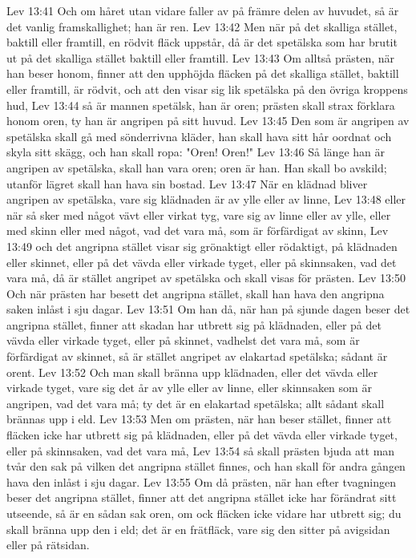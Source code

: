 Lev 13:41  Och om håret utan vidare faller av på främre delen av huvudet, så är det vanlig framskallighet; han är ren.
Lev 13:42  Men när på det skalliga stället, baktill eller framtill, en rödvit fläck uppstår, då är det spetälska som har brutit ut på det skalliga stället baktill eller framtill.
Lev 13:43  Om alltså prästen, när han beser honom, finner att den upphöjda fläcken på det skalliga stället, baktill eller framtill, är rödvit, och att den visar sig lik spetälska på den övriga kroppens hud,
Lev 13:44  så är mannen spetälsk, han är oren; prästen skall strax förklara honom oren, ty han är angripen på sitt huvud.
Lev 13:45  Den som är angripen av spetälska skall gå med sönderrivna kläder, han skall hava sitt hår oordnat och skyla sitt skägg, och han skall ropa: "Oren! Oren!"
Lev 13:46  Så länge han är angripen av spetälska, skall han vara oren; oren är han. Han skall bo avskild; utanför lägret skall han hava sin bostad.
Lev 13:47  När en klädnad bliver angripen av spetälska, vare sig klädnaden är av ylle eller av linne,
Lev 13:48  eller när så sker med något vävt eller virkat tyg, vare sig av linne eller av ylle, eller med skinn eller med något, vad det vara må, som är förfärdigat av skinn,
Lev 13:49  och det angripna stället visar sig grönaktigt eller rödaktigt, på klädnaden eller skinnet, eller på det vävda eller virkade tyget, eller på skinnsaken, vad det vara må, då är stället angripet av spetälska och skall visas för prästen.
Lev 13:50  Och när prästen har besett det angripna stället, skall han hava den angripna saken inlåst i sju dagar.
Lev 13:51  Om han då, när han på sjunde dagen beser det angripna stället, finner att skadan har utbrett sig på klädnaden, eller på det vävda eller virkade tyget, eller på skinnet, vadhelst det vara må, som är förfärdigat av skinnet, så är stället angripet av elakartad spetälska; sådant är orent.
Lev 13:52  Och man skall bränna upp klädnaden, eller det vävda eller virkade tyget, vare sig det år av ylle eller av linne, eller skinnsaken som är angripen, vad det vara må; ty det är en elakartad spetälska; allt sådant skall brännas upp i eld.
Lev 13:53  Men om prästen, när han beser stället, finner att fläcken icke har utbrett sig på klädnaden, eller på det vävda eller virkade tyget, eller på skinnsaken, vad det vara må,
Lev 13:54  så skall prästen bjuda att man tvår den sak på vilken det angripna stället finnes, och han skall för andra gången hava den inlåst i sju dagar.
Lev 13:55  Om då prästen, när han efter tvagningen beser det angripna stället, finner att det angripna stället icke har förändrat sitt utseende, så är en sådan sak oren, om ock fläcken icke vidare har utbrett sig; du skall bränna upp den i eld; det är en frätfläck, vare sig den sitter på avigsidan eller på rätsidan.
